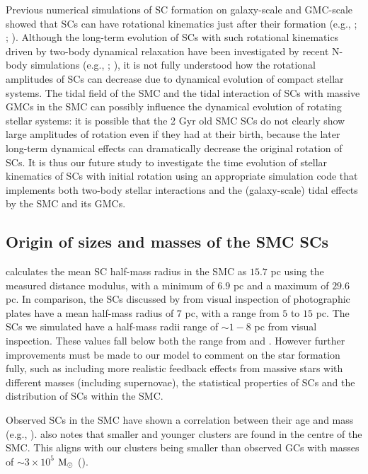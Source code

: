 \documentclass[fleqn,usenatbib]{mnras}
\begin{document}
Previous numerical simulations of SC formation on galaxy-scale and GMC-scale showed that SCs can have rotational kinematics just after their formation (e.g., \citealt{K26_Bekki2010}; \citealt{K27_Bekki2019}; \citealt{K28_Mapelli2017}). Although the long-term evolution of SCs with such rotational kinematics driven by two-body dynamical relaxation have been investigated by recent N-body simulations (e.g., \citealt{K29_Mastrobuono_Battisti_Perets2016}; \citealt{K30_Vesperini_et_al2021}), it is not fully understood how the rotational amplitudes of SCs can decrease due to dynamical evolution of compact stellar systems. The tidal field of the SMC and the tidal interaction of SCs with massive GMCs in the SMC can possibly influence the dynamical evolution of rotating stellar systems: it is possible that the 2 Gyr old SMC SCs do not clearly show large amplitudes of rotation even if they had at their birth, because the later long-term dynamical effects can dramatically decrease the original rotation of SCs. It is thus our future study to investigate the time evolution of stellar kinematics of SCs with initial rotation using an appropriate simulation code that implements both two-body stellar interactions and the (galaxy-scale) tidal effects by the SMC and its GMCs.




\subsection{Origin of sizes and masses of the SMC SCs}

\cite{11Bitsakis_et_al2018} calculates the mean SC half-mass radius in the SMC as $15.7$ pc using the measured distance modulus, with a minimum of $6.9$ pc and a maximum of $29.6$ pc. In comparison, the SCs discussed by \cite{4Boutloukos_Lamers2003} from visual inspection of photographic plates have a mean half-mass radius of $7$ pc, with a range from $5$ to $15$ pc. The SCs we simulated have a half-mass radii range of ${\sim}1-8$ pc from visual inspection. These values fall below both the range from \cite{4Boutloukos_Lamers2003} and \cite{11Bitsakis_et_al2018}. However further improvements must be made to our model to comment on the star formation fully, such as including more realistic feedback effects from massive stars with different masses (including supernovae), the statistical properties of SCs and the distribution of SCs within the SMC.



Observed SCs in the SMC have shown a correlation between their age and mass (e.g., \citealt{52Piatti2021}). \cite{52Piatti2021} also notes that smaller and younger clusters are found in the centre of the SMC. This aligns with our clusters being smaller than observed GCs with masses of ${\sim}3\times 10^5$ ${\rm M}_{\odot}$ (\citealt{85Hill_Zaritsky2006}). 
\end{document}
